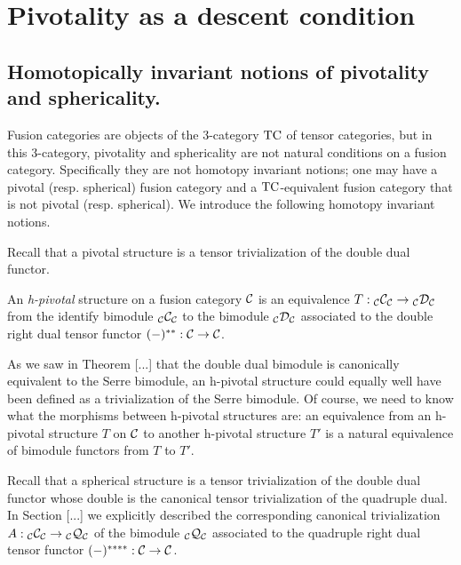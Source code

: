 \documentclass{amsart}
\begin{document}

\section{Pivotality as a descent condition} \label{sec-pivot}

\subsection{Homotopically invariant notions of pivotality and sphericality.}

Fusion categories are objects of the 3-category $\mathrm{TC}$ of tensor categories, but in this 3-category, pivotality and sphericality are not natural conditions on a fusion category.  Specifically they are not homotopy invariant notions; one may have a pivotal (resp. spherical) fusion category and a $\mathrm{TC}$-equivalent fusion category that is not pivotal (resp. spherical).    We introduce the following homotopy invariant notions.

Recall that a pivotal structure is a tensor trivialization of the double dual functor.

\begin{definition}
An \emph{h-pivotal} structure on a fusion category $\mathcal C$ is an equivalence $T: {}_{\mathcal C} {\mathcal C}_{\mathcal C} \rightarrow {}_{\mathcal C} {\mathcal D}_{\mathcal C}$ from the identify bimodule ${}_{\mathcal C} {\mathcal C}_{\mathcal C}$ to the bimodule ${}_{\mathcal C} {\mathcal D}_{\mathcal C}$ associated to the double right dual tensor functor $(-)^{**}: \mathcal C \rightarrow \mathcal C$.  
\end{definition}

\nid As we saw in Theorem [...] that the double dual bimodule is canonically equivalent to the Serre bimodule, an h-pivotal structure could equally well have been defined as a trivialization of the Serre bimodule.  Of course, we need to know what the morphisms between h-pivotal structures are: an equivalence from an h-pivotal structure $T$ on $\mathcal C$ to another h-pivotal structure $T'$ is a natural equivalence of bimodule functors from $T$ to $T'$.

Recall that a spherical structure is a tensor trivialization of the double dual functor whose double is the canonical tensor trivialization of the quadruple dual.  In Section [...] we explicitly described the corresponding canonical trivialization $A : {}_{\mathcal C} {\mathcal C}_{\mathcal C} \rightarrow {}_{\mathcal C} {\mathcal Q}_{\mathcal C}$ of the bimodule ${}_{\mathcal C} {\mathcal Q}_{\mathcal C}$ associated to the quadruple right dual tensor functor $(-)^{****}: \mathcal C \rightarrow \mathcal C$. 
\end{document}
